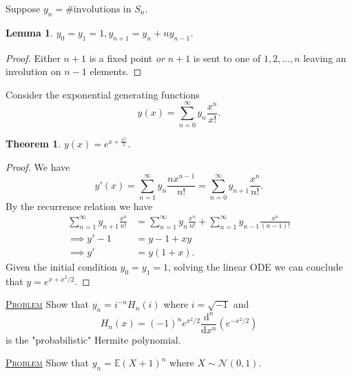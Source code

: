 \documentclass{report}
\newcommand{\df}{\mathrm{d}}
\newcommand{\fancyem}[1]{\underline{\textsc{#1}}}
\newtheorem{theorem}{Theorem}[section]
\newtheorem{lemma}{Lemma}[section]
\theoremstyle{definition}
\theoremstyle{remark}
\numberwithin{equation}{section}
\begin{document}
Suppose $y_n = \#\text{involutions in } S_n$.
\begin{lemma}
    $y_0 = y_1 = 1, y_{n+1} = y_n + ny_{n-1}$.
\end{lemma}
\begin{proof}
    Either $n + 1$ is a fixed point \emph{or} $n + 1$ is sent to one of $1, 2, \ldots, n$ leaving an involution on $n - 1$ elements.
\end{proof}
Consider the exponential generating functions \[
    y(x) = \sum_{n=0}^\infty y_n \frac{x^n}{x!}.    
\]
\begin{theorem}
    $\displaystyle y(x) = e^{x + \frac{x^2}{2}}$.
\end{theorem}
\begin{proof}
    We have \[
        y'(x) = \sum_{n=1}^\infty y_n \frac{nx^{n-1}}{n!} = \sum_{n=0}^\infty y_{n+1} \frac{x^n}{n!}.
    \]
    By the recurrence relation we have \begin{align*}
        \sum_{n=1}^\infty y_{n+1} \frac{x^n}{n!} & = \sum_{n=1}^\infty y_{n} \frac{x^n}{n!} + \sum_{n=1}^\infty y_{n-1} \frac{x^n}{(n-1)!}  \\
        \implies y' - 1 & = y - 1 + xy \\
        \implies y' & = y(1 + x).
    \end{align*}
    Given the initial condition $y_0 = y_1 = 1$, solving the linear ODE we can conclude that $y = e^{x + x^2/2}$.
\end{proof}
\fancyem{Problem} Show that $y_n = i^{-n}H_n(i)$ where $i = \sqrt{-1}$ and \[H_n(x) = (-1)^ne^{x^2/2}\frac{\df^n}{\df x^n}(e^{-x^2/2})\] is the "probabilistic" Hermite polynomial.

\fancyem{Problem} Show that $y_n = \mathbb{E}(X+1)^n$ where $X \sim \mathcal{N}(0, 1)$.
\end{document}
